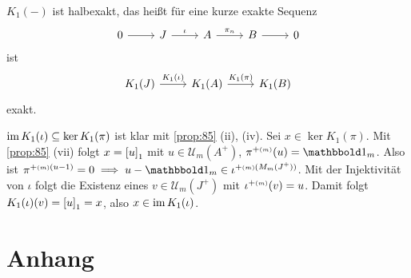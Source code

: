 \begin{proposition}
	$K_1(-)$ ist halbexakt, das heißt für eine kurze exakte Sequenz
	\[
		\begin{tikzcd}
			0 \rar & J \rar["\iota"] & A \rar["\pi_n"] & B \rar & 0
		\end{tikzcd}
	\]
	ist 
	\[
		\begin{tikzcd}
			K_1(J) \rar["K_1(\iota)"] & K_1(A) \rar["K_1(\pi)"] & K_1(B)
		\end{tikzcd}
	\]
	exakt.
\end{proposition}
\begin{beweis}
	$\im K_1(\iota) \subseteq \ker K_1(\pi)$ ist klar mit \autoref{prop:85} (ii), (iv).
	Sei $x \in \ker K_1(\pi)$.
	Mit \autoref{prop:85} (vii) folgt $x=\benbrace*{u}_1$ mit $u \in \mathcal{U}_m(A^+)$, $\pi^{+ \ssbrace{m}}(u)=\ind_m$.
	Also ist $\pi^{+\ssbrace{m}(u-1)}=0 \implies u - \ind_m \in \iota^{+\ssbrace{m}(M_m(J^+))}$.
	Mit der Injektivität von $\iota$ folgt die Existenz eines $v \in \mathcal{U}_m(J^+)$ mit $\iota^{+\ssbrace{m}}(v)=u$.
	Damit folgt $K_1(\iota)(v) = \benbrace*{u}_1= x$, also $x \in \im K_1(\iota)$.
\end{beweis}




\cleardoubleoddemptypage
{}
\setcounter{page}{1}
\cleardoubleoddemptypage
\appendix

\section{Anhang} %
\label{sec:anhang}

\printindex
\printbibliography
\listoffigures
\todototoc
{}

